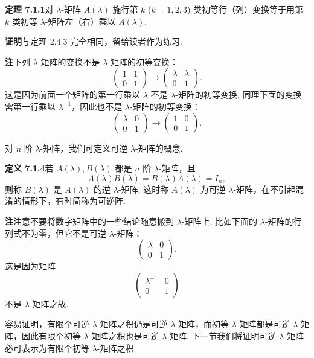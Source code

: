 \documentclass[UTF8, 12pt, fontset=fandol, oneside]{ctexart}
\begin{document}
\noindent\textbf{定理 7.1.1}\quad 对 $\lambda$-矩阵 $A(\lambda)$ 施行第 $k$ ($k=1,2,3$) 类初等行（列）变换等于用第 $k$ 类初等 $\lambda$-矩阵左（右）乘以 $A(\lambda)$.

\noindent\textbf{证明}\quad 与定理 2.4.3 完全相同，留给读者作为练习.

\noindent\textbf{注}\quad 下列 $\lambda$-矩阵的变换不是 $\lambda$-矩阵的初等变换：
\[
\left(\begin{array}{cc}
1 & 1\\
0 & 1
\end{array}\right)\to
\left(\begin{array}{cc}
\lambda & \lambda\\
0 & 1
\end{array}\right).
\]
这是因为前面一个矩阵的第一行乘以 $\lambda$ 不是 $\lambda$-矩阵的初等变换. 同理下面的变换需第一行乘以 $\lambda^{-1}$，因此也不是 $\lambda$-矩阵的初等变换：
\[
\left(\begin{array}{cc}
\lambda & 0\\
0 & 1
\end{array}\right)\to
\left(\begin{array}{cc}
1 & 0\\
0 & 1
\end{array}\right).
\]

对 $n$ 阶 $\lambda$-矩阵，我们可定义可逆 $\lambda$-矩阵的概念.

\noindent\textbf{定义 7.1.4}\quad 若 $A(\lambda),B(\lambda)$ 都是 $n$ 阶 $\lambda$-矩阵，且
\[
A(\lambda)B(\lambda)=B(\lambda)A(\lambda)=I_n,
\]
则称 $B(\lambda)$ 是 $A(\lambda)$ 的逆 $\lambda$-矩阵. 这时称 $A(\lambda)$ 为可逆 $\lambda$-矩阵，在不引起混淆的情形下，有时简称为可逆阵.

\noindent\textbf{注}\quad 注意不要将数字矩阵中的一些结论随意搬到 $\lambda$-矩阵上. 比如下面的 $\lambda$-矩阵的行列式不为零，但它不是可逆 $\lambda$-矩阵：
\[
\left(\begin{array}{cc}
\lambda & 0\\
0 & 1
\end{array}\right).
\]
这是因为矩阵
\[
\left(\begin{array}{cc}
\lambda^{-1} & 0\\
0 & 1
\end{array}\right)
\]
不是 $\lambda$-矩阵之故.

容易证明，有限个可逆 $\lambda$-矩阵之积仍是可逆 $\lambda$-矩阵，而初等 $\lambda$-矩阵都是可逆 $\lambda$-矩阵，因此有限个初等 $\lambda$-矩阵之积也是可逆 $\lambda$-矩阵. 下一节我们将证明可逆 $\lambda$-矩阵必可表示为有限个初等 $\lambda$-矩阵之积.
\end{document}
